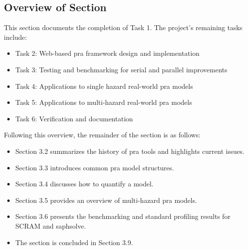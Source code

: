 \subsection{Overview of Section}
\label{sec:overview}

This section documents the completion of Task 1. The project's remaining tasks include:
\begin{itemize}
\item Task 2: Web-based \acrshort{pra} framework design and implementation
\item Task 3: Testing and benchmarking for serial and parallel improvements
\item Task 4: Applications to single hazard real-world \acrshort{pra} models
\item Task 5: Applications to multi-hazard real-world \acrshort{pra} models
\item Task 6: Verification and documentation
\end{itemize}

Following this overview, the remainder of the section is as follows:
\begin{itemize}
\item Section 3.2 summarizes the history of \acrshort{pra} tools and highlights current issues.
\item Section 3.3 introduces common \acrshort{pra} model structures.
\item Section 3.4 discusses how to quantify a model.
\item Section 3.5 provides an overview of multi-hazard \acrshort{pra} models.
\item Section 3.6 presents the benchmarking and standard profiling results for SCRAM and \acrfull{saphsolve}.
\item The section is concluded in Section 3.9.
\end{itemize}
